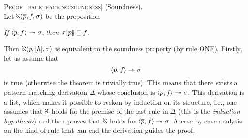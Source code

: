 
\noindent\textsc{Proof~\ref{backtracking:soundness}} (Soundness).\\
\noindent Let \(\ind{R}(\overline{p}, f, \sigma)\) be the proposition
\begin{center}
\emph{If} \(\smj{f}{\overline{p}}{\sigma}\),
\emph{then} \(\subst{\overline{p}}{\sigma} \sqsubseteq f\).
\end{center}
Then \(\ind{R}(p, [h], \sigma)\) is equivalent to the soundness
property (by rule \textsf{ONE}). Firstly, let us assume that
\begin{equation}
  \smj{f}{\overline{p}}{\sigma} \label{x:sound:head}
\end{equation}
is true (otherwise the theorem is trivially true). This means that
there exists a pattern\hyp{}matching derivation \(\Delta\) whose
conclusion is \(\smj{f}{\overline{p}}{\sigma}\). This derivation is a
list, which makes it possible to reckon by induction on its structure,
i.e., one assumes that \(\ind{R}\) holds for the premise of the last
rule in \(\Delta\) (this is the \emph{induction hypothesis}) and then
proves that \(\ind{R}\) holds for \(\smj{f}{\overline{p}}{\sigma}\). A
case by case analysis on the kind of rule that can end the derivation
guides the proof.
